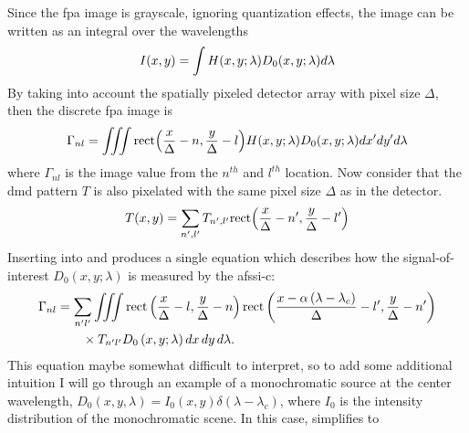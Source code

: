 Since the \gls{fpa} image is grayscale, ignoring quantization effects, the image can be written as an integral over the wavelengths
%
\begin{equation}
	I\ap{x,y} = \int H \ap{x,y;\lambda}  D_0 \ap{x,y;\lambda} d\lambda
\end{equation}
%
By taking into account the spatially pixeled detector array with pixel size $\Delta$, then the discrete \gls{fpa} image is
%
\begin{equation}
	\Gamma_{nl} = \iiint \mbox{rect} \ap{ \frac{x}{\Delta} - n, \frac{y}{\Delta} - l } H \ap{x,y;\lambda} D_0 \ap{x,y;\lambda} dx^\prime dy^\prime d\lambda
	\label{eq:afssicDiscreteReadout}
\end{equation}
%
where $\Gamma_{nl}$ is the image value from the $n^{th}$ and $l^{th}$ location. Now consider that the \gls{dmd} pattern $T$ is also pixelated with the same pixel size $\Delta$ as in the detector. 
%
\begin{equation}
	T \ap{x,y} = \sum_{n^\prime, l^\prime}  T_{n^\prime, l^\prime} \mbox{rect} \ap{ \frac{x}{\Delta} - n^\prime, \frac{y}{\Delta} - l^\prime}
	\label{eq:afssicDiscreteDMD}
\end{equation}
%
Inserting  into  and  produces a single equation which describes how the signal-of-interest $D_0 \left( x, y; \lambda \right)$ is measured by the \gls{afssi-c}:
%
\begin{align} \label{eq:PixelizedDetectIntensity}
	\Gamma_{nl} &= \sum_{n^\prime l^\prime} \iiint \mbox{rect} \left( \frac{x}{\Delta} - l, \frac{y}{\Delta} - n \right) \mbox{rect} \left( \frac{x-\alpha \left(\lambda - \lambda_c\right)}{\Delta} - l^\prime , \frac{y}{\Delta} - n^\prime \right) \notag \\
 	&\qquad \times T_{n^\prime l^\prime} D_0 \left( x, y; \lambda \right) dx \, dy \, d\lambda.
\end{align}
%
This equation maybe somewhat difficult to interpret, so to add some additional intuition I will go through an example of a monochromatic source at the center wavelength, $D_0 \left(x, y, \lambda\right) = I_0 \left(x, y \right) \delta \left( \lambda - \lambda_c \right)$, where $I_0$ is the intensity distribution of the monochromatic scene. In this case,  simplifies to
%
%

